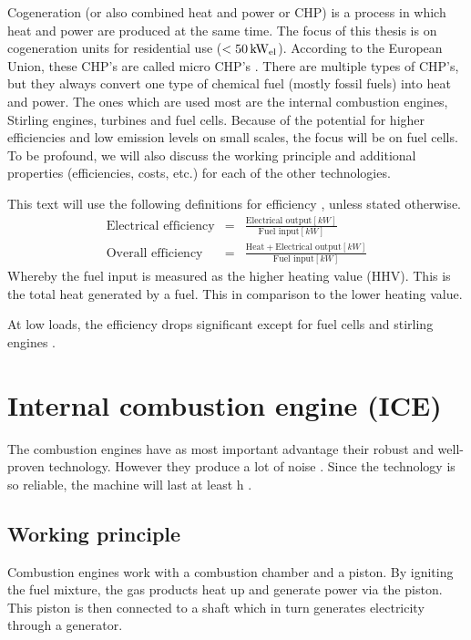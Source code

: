 Cogeneration (or also combined heat and power or CHP) is a process in which heat and power are produced at the same time. The focus of this thesis is on cogeneration units for residential use ($<\unit[50]{kW_{el}}$). According to the European Union, these CHP's are called micro CHP's \cite{Commission2010}.
There are multiple types of CHP's, but they always convert one type of chemical fuel (mostly fossil fuels) into heat and power. The ones which are used most are the internal combustion engines, Stirling engines, turbines and fuel cells. Because of the potential for higher efficiencies and low emission levels \cite{Onovwiona2006} on small scales, the focus will be on fuel cells. To be profound, we will also discuss the working principle and additional properties (efficiencies, costs, etc.) for each of the other technologies.

This text will use the following definitions for efficiency \cite{Onovwiona2006}, unless stated otherwise.
\begin{eqnarray}
\text{Electrical efficiency} &=& \frac{\text{Electrical output} [\unit{kW}]}{\text{Fuel input} [\unit{kW}]}\\
\text{Overall efficiency} &=& \frac{\text{Heat} + \text{Electrical output} [\unit{kW}]}{\text{Fuel input} [\unit{kW}]}
\end{eqnarray}
Whereby the fuel input is measured as the higher heating value (HHV). This is the total heat generated by a fuel. This in comparison to the lower heating value.

At low loads, the efficiency drops significant except for fuel cells and stirling engines \cite{Onovwiona2006}.

\section{Internal combustion engine (ICE)}
The combustion engines have as most important advantage their robust and well-proven technology\cite{Onovwiona2006}. However they produce a lot of noise \cite{??}. Since the technology is so reliable, the machine will last at least \unit[20 000]{h} \cite{Onovwiona2006}.
\subsection{Working principle}
Combustion engines work with a combustion chamber and a piston. By igniting the fuel mixture, the gas products heat up and generate power via the piston. This piston is then connected to a shaft which in turn generates electricity through a generator.

